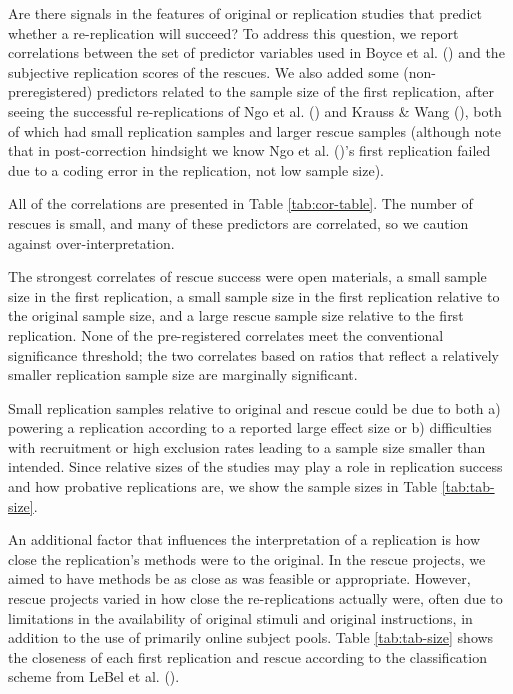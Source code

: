 \documentclass[
  english,
  a4paper,
]{article}
\begin{document}
Are there signals in the features of original or replication studies that predict whether a re-replication will succeed?
To address this question, we report correlations between the set of predictor variables used in Boyce et al. () and the subjective replication scores of the rescues.
We also added some (non-preregistered) predictors related to the sample size of the first replication, after seeing the successful re-replications of Ngo et al. () and Krauss \& Wang (), both of which had small replication samples and larger rescue samples (although note that in post-correction hindsight we know Ngo et al. ()'s first replication failed due to a coding error in the replication, not low sample size).

All of the correlations are presented in Table \ref{tab:cor-table}.
The number of rescues is small, and many of these predictors are correlated, so we caution against over-interpretation.

The strongest correlates of rescue success were open materials, a small sample size in the first replication, a small sample size in the first replication relative to the original sample size, and a large rescue sample size relative to the first replication.
None of the pre-registered correlates meet the conventional significance threshold; the two correlates based on ratios that reflect a relatively smaller replication sample size are marginally significant.

Small replication samples relative to original and rescue could be due to both a) powering a replication according to a reported large effect size or b) difficulties with recruitment or high exclusion rates leading to a sample size smaller than intended.
Since relative sizes of the studies may play a role in replication success and how probative replications are, we show the sample sizes in Table \ref{tab:tab-size}.

An additional factor that influences the interpretation of a replication is how close the replication's methods were to the original.
In the rescue projects, we aimed to have methods be as close as was feasible or appropriate.
However, rescue projects varied in how close the re-replications actually were, often due to limitations in the availability of original stimuli and original instructions, in addition to the use of primarily online subject pools.
Table \ref{tab:tab-size} shows the closeness of each first replication and rescue according to the classification scheme from LeBel et al. ().
\end{document}
